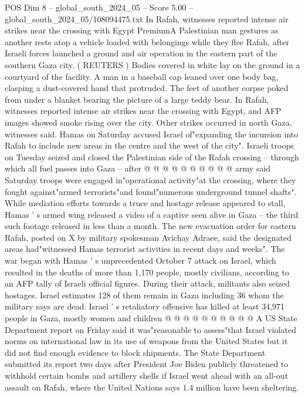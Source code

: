 \begin{textsample}{POS Dim 8 – global\_south\_2024\_05 – Score 5.00 – global\_south\_2024\_05/108094475.txt}  \label{ex:f8_pos_341}
In Rafah, witnesses reported intense air strikes near the crossing with Egypt PremiumA Palestinian man gestures as another rests atop a vehicle loaded with belongings while they flee Rafah, after Israeli forces launched a ground and air operation in the eastern part of the southern Gaza city. ( REUTERS ) Bodies covered in white lay on the ground in a courtyard of the facility.
A man in a baseball cap leaned over one body bag, clasping a dust-covered hand that protruded.
The feet of another corpse poked from under a blanket bearing the picture of a large teddy bear.
In Rafah, witnesses reported intense air strikes near the crossing with Egypt, and AFP images showed smoke rising over the city.
Other strikes occurred in north Gaza, witnesses said.
Hamas on Saturday accused Israel of"expanding the incursion into Rafah to include new areas in the centre and the west of the city".
Israeli troops on Tuesday seized and closed the Palestinian side of the Rafah crossing -- through which all fuel passes into Gaza -- after @ @ @ @ @ @ @ @ @ @ army said Saturday troops were engaged in"operational activity"at the crossing, where they fought against"armed terrorists"and found"numerous underground tunnel shafts".
While mediation efforts towards a truce and hostage release appeared to stall, Hamas ' s armed wing released a video of a captive seen alive in Gaza -- the third such footage released in less than a month.
The new evacuation order for eastern Rafah, posted on X by military spokesman Avichay Adraee, said the designated areas had"witnessed Hamas terrorist activities in recent days and weeks".
The war began with Hamas ' s unprecedented October 7 attack on Israel, which resulted in the deaths of more than 1,170 people, mostly civilians, according to an AFP tally of Israeli official figures.
During their attack, militants also seized hostages.
Israel estimates 128 of them remain in Gaza including 36 whom the military says are dead.
Israel ' s retaliatory offensive has killed at least 34,971 people in Gaza, mostly women and children @ @ @ @ @ @ @ @ @ @ A US State Department report on Friday said it was"reasonable to assess"that Israel violated norms on international law in its use of weapons from the United States but it did not find enough evidence to block shipments.
The State Department submitted its report two days after President Joe Biden publicly threatened to withhold certain bombs and artillery shells if Israel went ahead with an all-out assault on Rafah, where the United Nations says 1.4 million have been sheltering.

\end{textsample}
